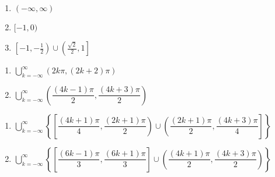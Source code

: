 \begin{multicols}{3}

\begin{enumerate}

\setcounter{enumi}{\value{HW}}


\item $(-\infty, \infty)$
\item $[-1,0)$ 
\item $\left[-1, -\frac{1}{2}\right) \cup \left( \frac{\sqrt{2}}{2}, 1\right]$

\setcounter{HW}{\value{enumi}}

\end{enumerate}

\end{multicols}

\begin{multicols}{2}

\begin{enumerate}

\setcounter{enumi}{\value{HW}}

\item $\displaystyle \bigcup_{k=-\infty}^{\infty} \left( 2k\pi, (2k+2)\pi \right)$
\item $\displaystyle \bigcup_{k=-\infty}^{\infty} \left( \dfrac{(4k - 1)\pi}{2}, \dfrac{(4k + 3)\pi}{2} \right)$

\setcounter{HW}{\value{enumi}}

\end{enumerate}

\end{multicols}

\begin{enumerate}

\setcounter{enumi}{\value{HW}}

\item $\displaystyle \bigcup_{k=-\infty}^{\infty} \left\{ \left[ \dfrac{(4k + 1)\pi}{4}, \dfrac{(2k + 1)\pi}{2} \right) \cup \left( \dfrac{(2k + 1)\pi}{2}, \dfrac{(4k + 3)\pi}{4} \right] \right\}$

\item $\displaystyle \bigcup_{k=-\infty}^{\infty} \left\{ \left[ \dfrac{(6k - 1)\pi}{3}, \dfrac{(6k + 1)\pi}{3} \right] \cup \left( \dfrac{(4k + 1)\pi}{2}, \dfrac{(4k + 3)\pi}{2} \right) \right\}$

\setcounter{HW}{\value{enumi}}

\end{enumerate}

